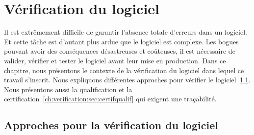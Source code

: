 \chapter{Vérification du logiciel}
\label{ch:verification}


Il est extrêmement difficile de garantir l'absence totale d'erreurs
dans un logiciel. Et cette tâche est d'autant plus ardue que le logiciel est
complexe. Les bogues pouvant avoir des conséquences désastreuses et
coûteuses, il est nécessaire de valider, vérifier et tester le logiciel avant
leur mise en production. Dans ce chapitre, nous présentons le contexte de la
vérification du logiciel dans lequel ce travail s'inscrit.  Nous expliquons
différentes approches pour vérifier le
logiciel~\ref{ch:verification:sec:approches}. Nous présentons aussi la
qualification et la certification~\ref{ch:verification:sec:certifqualif} qui
exigent une traçabilité.




%
%

\section{Approches pour la vérification du logiciel}
\label{ch:verification:sec:approches}


